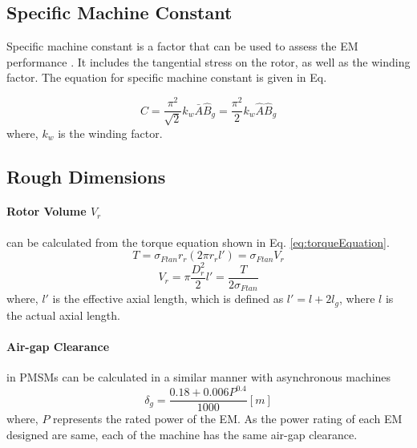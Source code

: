 \documentclass [a4 paper, 11pt, titlepage] {article}
\begin{document}
	\subsection{Specific Machine Constant}
	Specific machine constant is a factor that can be used to assess the EM performance \cite{pyrhonen_design_2014}. It includes the tangential stress on the rotor, as well as the winding factor. The equation for specific machine constant is given in Eq. 
	
	\begin{equation}
		C=\frac{\pi^2}{\sqrt{2}}k_w\bar{A}\hat{B}_g=\frac{\pi^2}{2}k_w\hat{A}\hat{B}_g
	\end{equation}
	where, $k_w$ is the winding factor.
	
	
	\subsection{Rough Dimensions}
	
	
	\paragraph{Rotor Volume $V_r$} can be calculated from the torque equation shown in Eq. \ref{eq:torqueEquation}.
	\begin{equation}
		T=\sigma_{Ftan}r_r(2\pi r_rl')=\sigma_{Ftan}V_r 
		\label{eq:torqueEquation}	
	\end{equation}
	\begin{equation}
		V_r=\pi\frac{D^2_r}{2}l'=\frac{T}{2\sigma_{Ftan}}
	\end{equation}
	where, $l'$ is the effective axial length, which is defined as $l'=l+2l_g$, where $l$ is the actual axial length.

	\paragraph{Air-gap Clearance} in PMSMs can be calculated in a similar manner with asynchronous machines
	\begin{equation}
		\delta_g=\frac{0.18+0.006P^{0.4}}{1000} [m]
	\end{equation}
	where, $P$ represents the rated power of the EM. As the power rating of each EM designed are same, each of the machine has the same air-gap clearance.
	
\end{document}
